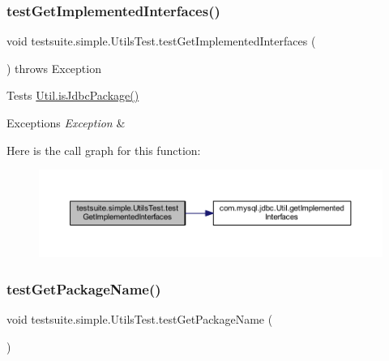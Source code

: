 \subsubsection{\texorpdfstring{test\+Get\+Implemented\+Interfaces()}{testGetImplementedInterfaces()}}
{\footnotesize\ttfamily void testsuite.\+simple.\+Utils\+Test.\+test\+Get\+Implemented\+Interfaces (\begin{DoxyParamCaption}{ }\end{DoxyParamCaption}) throws Exception}

Tests \mbox{\hyperlink{classcom_1_1mysql_1_1jdbc_1_1_util_a9cb2ac4a8521a60214e3186ad634b3b3}{Util.\+is\+Jdbc\+Package()}}


\begin{DoxyExceptions}{Exceptions}
{\em Exception} & \\
\hline
\end{DoxyExceptions}
Here is the call graph for this function\+:
\nopagebreak
\begin{figure}[H]
\begin{center}
\leavevmode
\includegraphics[width=350pt]{classtestsuite_1_1simple_1_1_utils_test_a173e24f02866b3c9a9356d28077db9b3_cgraph}
\end{center}
\end{figure}
\mbox{\label{classtestsuite_1_1simple_1_1_utils_test_a15e2df447f329b76ef2115f6583296c0}} 
\subsubsection{\texorpdfstring{test\+Get\+Package\+Name()}{testGetPackageName()}}
{\footnotesize\ttfamily void testsuite.\+simple.\+Utils\+Test.\+test\+Get\+Package\+Name (\begin{DoxyParamCaption}{ }\end{DoxyParamCaption})}


